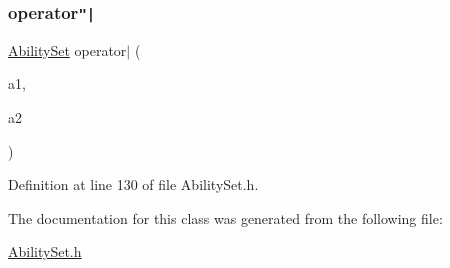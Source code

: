 \subsubsection{\texorpdfstring{operator\texttt{"|}}{operator|}}
{\footnotesize\ttfamily \hyperlink{classocra_1_1AbilitySet}{Ability\+Set} operator$\vert$ (\begin{DoxyParamCaption}\item[{const \hyperlink{classocra_1_1AbilitySet}{Ability\+Set}}]{a1,  }\item[{const \hyperlink{classocra_1_1AbilitySet}{Ability\+Set}}]{a2 }\end{DoxyParamCaption})\hspace{0.3cm}{\ttfamily [friend]}}



Definition at line 130 of file Ability\+Set.\+h.



The documentation for this class was generated from the following file\+:\begin{DoxyCompactItemize}
\item 
\hyperlink{AbilitySet_8h}{Ability\+Set.\+h}\end{DoxyCompactItemize}
